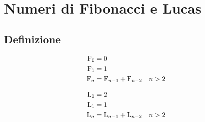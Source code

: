 \chapter{Numeri di Fibonacci e Lucas}
\section{Definizione}
\begin{defn}
	\begin{align}
		\mathrm{F}_{0}={} & 0\notag                                         \\
		\mathrm{F}_{1}={} & 1\notag                                         \\
		\mathrm{F}_{n}={} & \mathrm{F}_{n-1}+\mathrm{F}_{n-2}\quad n>2\label{eqn:Fibodef}
	\end{align}
\end{defn}
\begin{defn}
	\begin{align}
		\mathrm{L}_{0}={} & 2\notag                                         \\
		\mathrm{L}_{1}={} & 1\notag                                         \\
		\mathrm{L}_{n}={} & \mathrm{L}_{n-1}+\mathrm{L}_{n-2}\quad n>2\label{eqn:Lucadef}
	\end{align}
\end{defn}

